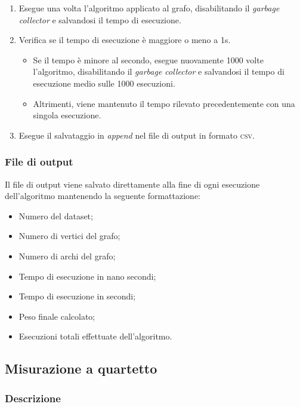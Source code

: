 \begin{enumerate}
    \item Esegue una volta l'algoritmo applicato al grafo, disabilitando il \textit{garbage collector} e salvandosi il tempo di esecuzione.
    \item Verifica se il tempo di esecuzione è maggiore o meno a 1s.
    \begin{itemize}
        \item Se il tempo è minore al secondo, esegue nuovamente 1000 volte l'algoritmo, disabilitando il \textit{garbage collector} e salvandosi il tempo di esecuzione medio sulle 1000 esecuzioni.
        \item Altrimenti, viene mantenuto il tempo rilevato precedentemente con una singola esecuzione.
    \end{itemize}
    \item Esegue il salvataggio in \textit{append} nel file di output in formato \textsc{csv}.
\end{enumerate}


\subsubsection{File di output}

Il file di output viene salvato direttamente alla fine di ogni esecuzione dell'algoritmo mantenendo la seguente formattazione:
\begin{itemize}
    \item Numero del dataset;
    \item Numero di vertici del grafo;
    \item Numero di archi del grafo;
    \item Tempo di esecuzione in nano secondi;
    \item Tempo di esecuzione in secondi;
    \item Peso finale calcolato;
    \item Esecuzioni totali effettuate dell'algoritmo.
\end{itemize}


\subsection{Misurazione a quartetto}

\subsubsection{Descrizione} 


